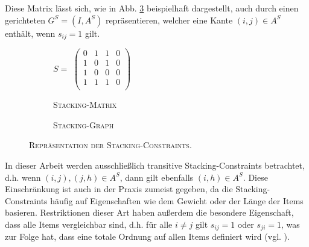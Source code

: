 Diese Matrix lässt sich, wie in Abb. \ref{fig:matrix_to_graph} beispielhaft dargestellt, auch durch einen
gerichteten  $G^S = (I, A^S)$ repräsentieren, welcher eine Kante $(i, j) \in A^S$ enthält,
wenn $s_{ij} = 1$ gilt.
\begin{figure}[H]
  \begin{subfigure}[b]{0.5\textwidth}
  \centering
    $S =$
    $\left(
    \begin{array}{rrrr}
    0 & 1 & 1 & 0 \\
    1 & 0 & 1 & 0 \\
    1 & 0 & 0 & 0 \\
    1 & 1 & 1 & 0 \\
    \end{array} \right) $
    \caption{\textsc{Stacking-Matrix}}
    \label{fig:constraint_matrix}
  \end{subfigure}
  \hfill
  \begin{subfigure}[b]{0.5\textwidth}
  \centering
    \caption{\textsc{Stacking-Graph}}
    \label{fig:resulting_graph}
  \end{subfigure}
  \caption{\textsc{Repräsentation der Stacking-Constraints.}}
  \label{fig:matrix_to_graph}
\end{figure}

\vfill
\pagebreak

In dieser Arbeit werden ausschließlich transitive Stacking-Constraints betrachtet, d.h.
wenn $(i, j), (j, h) \in A^S$, dann gilt ebenfalls $(i, h) \in A^S$.
Diese Einschränkung ist auch in der Praxis zumeist gegeben, da die Stacking-Constraints häufig auf Eigenschaften wie dem Gewicht oder der Länge der Items basieren. Restriktionen dieser Art haben außerdem die besondere Eigenschaft, dass alle Items vergleichbar sind, d.h. für alle $i \neq j$ gilt $s_{ij} = 1$ oder $s_{ji} = 1$, was zur Folge hat,
dass eine totale Ordnung auf allen Items definiert wird (vgl. \citet{Bruns2015}).

